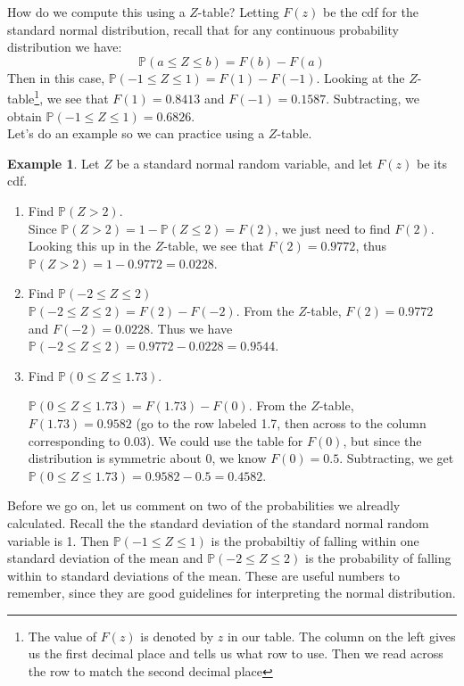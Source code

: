 \documentclass[12pt]{article}
\theoremstyle{definition}
\newtheorem*{example}{Example}
\theoremstyle{remark}
\def\P{{\mathbb P}}
\begin{document}
How do we compute this using a $Z$-table? Letting $F(z)$ be the cdf for the standard normal distribution, recall that for any continuous probability distribution we have:
\[
\P(a \leq Z \leq b) = F(b) - F(a)
\]
Then in this case, $\P(-1 \leq Z \leq 1) = F(1) - F(-1)$. Looking at the $Z$-table\footnote{The value of $F(z)$ is denoted by $z$ in our table. The column on the left gives us the first decimal place and tells us what row to use. Then we read across the row to match the second decimal place}, we see that $F(1) = 0.8413$ and $F(-1) = 0.1587.$ Subtracting, we obtain $\P(-1 \leq Z \leq 1) = 0.6826$.\\

Let's do an example so we can practice using a $Z$-table.

\begin{example}Let $Z$ be a standard normal random variable, and let $F(z)$ be its cdf.
\begin{enumerate}
\item Find $\P(Z > 2)$.\\

Since $\P(Z > 2) = 1 - \P(Z \leq 2) = F(2)$, we just need to find $F(2)$. Looking this up in the $Z$-table, we see that $F(2) = 0.9772$, thus $\P(Z > 2) = 1 - 0.9772 = 0.0228$.

\item Find $\P(-2 \leq Z \leq 2)$\\

$\P(-2 \leq Z \leq 2) = F(2) - F(-2)$. From the $Z$-table, $F(2) = 0.9772$ and $F(-2) = 0.0228$. Thus we have $\P(-2 \leq Z \leq 2) = 0.9772 - 0.0228 = 0.9544$.

\item Find $\P(0 \leq Z \leq 1.73)$.

$\P(0 \leq Z \leq 1.73) = F(1.73) - F(0)$. From the $Z$-table, $F(1.73) = 0.9582$ (go to the row labeled 1.7, then across to the column corresponding to 0.03). We could use the table for $F(0)$, but since the distribution is symmetric about 0, we know $F(0) = 0.5$. Subtracting, we get $\P(0 \leq Z \leq 1.73) = 0.9582 - 0.5 = 0.4582$.

\end{enumerate}
\end{example}

Before we go on, let us comment on two of the probabilities we alreadly calculated. Recall the the standard deviation of the standard normal random variable is 1. Then $\P(-1 \leq Z \leq 1)$ is the probabiltiy of falling within one standard deviation of the mean and $\P(-2 \leq Z \leq 2)$ is the probability of falling within to standard deviations of the mean. These are useful numbers to remember, since they are good guidelines for interpreting the normal distribution.
\end{document}
